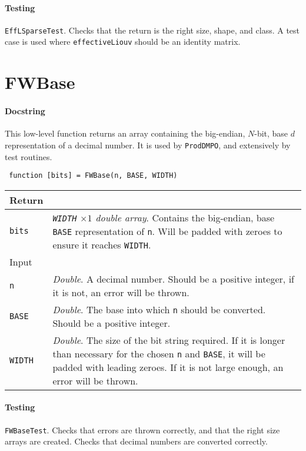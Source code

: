  \paragraph{Testing} \lstinline$EffLSparseTest$. Checks that the return is the right size, shape, and class. A test case is used where \lstinline$effectiveLiouv$ should be an identity matrix.

 \section{FWBase}
 \paragraph{Docstring} This low-level function returns an array containing the big-endian, \(N\)-bit, base \(d\) representation of a decimal number. It is used by \lstinline$ProdDMPO$, and extensively by test routines.
 \begin{lstlisting}
 function [bits] = FWBase(n, BASE, WIDTH) \end{lstlisting}
 \begin{longtabu}{X[1,l]X[4,l]}
 \hline
 Return & \\ \hline
 \lstinline$bits$ & \emph{\lstinline$WIDTH$ \(\times 1\) double array}. Contains the big-endian, base \lstinline$BASE$ representation of \lstinline$n$. Will be padded with zeroes to ensure it reaches \lstinline$WIDTH$. \\ \hline
 Input & \\ \hline
 \lstinline$n$ & \emph{Double}. A decimal number. Should be a positive integer, if it is not, an error will be thrown. \\
 \lstinline$BASE$ & \emph{Double}. The base into which \lstinline$n$ should be converted. Should be a positive integer. \\
 \lstinline$WIDTH$ & \emph{Double}. The size of the bit string required. If it is longer than necessary for the chosen \lstinline$n$ and \lstinline$BASE$, it will be padded with leading zeroes. If it is not large enough, an error will be thrown. \\
 \hline
 \end{longtabu}
 \paragraph{Testing} \lstinline$FWBaseTest$. Checks that errors are thrown correctly, and that the right size arrays are created. Checks that decimal numbers are converted correctly.

